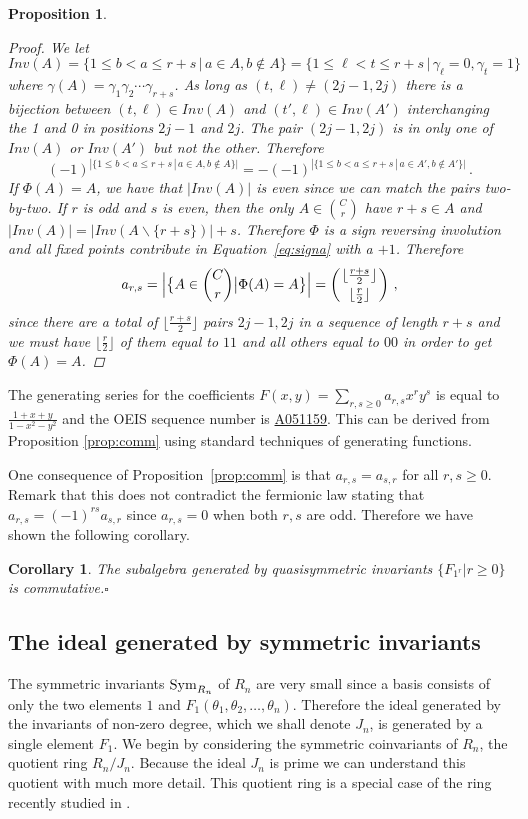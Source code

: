\documentclass[11pt,oneside]{amsart}
\newtheorem{prop}[theorem]{Proposition}
\newtheorem{cor}[theorem]{Corollary}
\theoremstyle{definition}
\numberwithin{equation}{section}
\newcommand{\mike}[1]{\todo[size=\tiny,color=lime!30]{#1 \\ \hfill --- Mike}}
\begin{document}
\begin{prop}
\begin{proof}
We let
 $$Inv(A)=\{1\le b<a\le r+s\,|\,a\in A, b\not\in A\}=\{1\le \ell<t\le r+s\,|\,\gamma_\ell=0,\gamma_t=1 \}\,$$
 where $\gamma(A)=\gamma_1\gamma_2\cdots\gamma_{r+s}$.
As long as $(t,\ell)\ne(2j-1,2j)$ there is a bijection between $(t,\ell)\in Inv(A)$ and
$(t',\ell)\in Inv(A')$ interchanging the 1 and 0 in positions $2j-1$ and $2j$.
The pair $(2j-1,2j)$ is in only one of $Inv(A)$ or $Inv(A')$ but not the other. Therefore
$$(-1)^{|\{1\le b<a\le r+s\,|\,a\in A, b\not\in A\}|} = -(-1)^{|\{1\le b<a\le r+s\,|\,a\in A', b\not\in A'\}|}\,.$$
If $\Phi(A)=A$, we have that $|Inv(A)|$ is even since we can match the pairs two-by-two.
If $r$ is odd and $s$ is even, then the only $A \in \binom{C}{r}$ have
$r+s \in A$ and $|Inv(A)| = |Inv(A \backslash \{ r+s \})| + s$.
Therefore $\Phi$ is a sign reversing involution and all fixed points contribute
in Equation~\eqref{eq:signa} with a $+1$. Therefore
$$a_{r,s}=\Big|\big\{ A\in {C\choose r}\big| \Phi(A)=A\big\}\Big|=\left({\lfloor \frac{r+s}{2} \rfloor \atop \lfloor \frac{r}{2} \rfloor}\right)\,,$$
since there are a total of $\lfloor \frac{r+s}{2} \rfloor$ pairs $2j-1,2j$
in a sequence of length $r+s$ and we must have $\lfloor \frac{r}{2} \rfloor$ of them equal to $11$
and all others equal to $00$ in order to get $\Phi(A)=A$.
\end{proof}
\end{prop}

The generating series for the coefficients $F(x,y) = \sum_{r,s \ge 0} a_{r,s} x^{r}y^{s}$ is
equal to $\frac{1 + x + y}{1 - x^{2} - y^{2}}$
and the OEIS \cite{OEIS} sequence number is \href{https://oeis.org/A051159}{A051159}.
This can be derived from Proposition \ref{prop:comm} using standard techniques of generating functions.

One consequence of Proposition~\ref{prop:comm} is that $a_{r,s}=a_{s,r}$ for all $r,s\ge 0$. Remark that this does not contradict the fermionic law stating that $a_{r,s}=(-1)^{rs}a_{s,r}$ since $a_{r,s}=0$ when both $r,s$ are odd. Therefore we have shown the following corollary.

\begin{cor}
The subalgebra generated by quasisymmetric invariants $\{F_{1^r}|r\ge 0\}$ is commutative.\hfill$\square$
\end{cor}

\subsection{The ideal generated by symmetric invariants}
The symmetric invariants ${\rm Sym}_{R_n}$ of $R_n$ are very small since a basis consists of only the two
elements $1$ and $F_1(\theta_1, \theta_2, \ldots, \theta_n)$.  Therefore the ideal generated by the invariants of non-zero
degree, which we shall denote $J_n$, is generated by a single element
$F_1$.
We begin by considering the symmetric
coinvariants of $R_n$, the quotient ring $R_n/J_n$.
Because the ideal $J_n$ is prime we can
understand this quotient with much more detail.
This quotient ring is a special case of the ring
recently studied in \cite{IRR,KR}.
\end{document}
